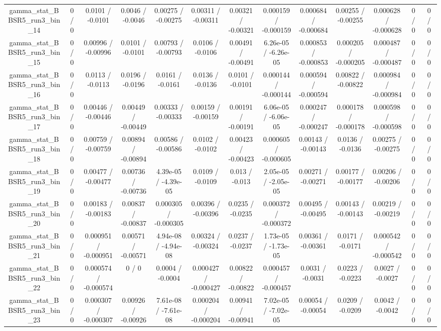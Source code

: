 \documentclass[10pt]{article}
\begin{document}
\begin{table}[htbp]
\begin{center}
\begin{tabular}{|c|c|c|c|c|c|c|c|c|c|c|c|c|}
  gamma_stat_BBSR5_run3_bin_14 & 0 / 0 & 0.0101 / -0.0101 & 0.0046 / -0.0046 & 0.00275 / -0.00275 & 0.00311 / -0.00311 & 0.00321 / -0.00321 & 0.000159 / -0.000159 & 0.000684 / -0.000684 & 0.00255 / -0.00255 & 0.000628 / -0.000628 & 0 / 0 & 0 / 0 \\ 
  gamma_stat_BBSR5_run3_bin_15 & 0 / 0 & 0.00996 / -0.00996 & 0.0101 / -0.0101 & 0.00793 / -0.00793 & 0.0106 / -0.0106 & 0.00491 / -0.00491 & 6.26e-05 / -6.26e-05 & 0.000853 / -0.000853 & 0.000205 / -0.000205 & 0.000487 / -0.000487 & 0 / 0 & 0 / 0 \\ 
  gamma_stat_BBSR5_run3_bin_16 & 0 / 0 & 0.0113 / -0.0113 & 0.0196 / -0.0196 & 0.0161 / -0.0161 & 0.0136 / -0.0136 & 0.0101 / -0.0101 & 0.000144 / -0.000144 & 0.000594 / -0.000594 & 0.00822 / -0.00822 & 0.000984 / -0.000984 & 0 / 0 & 0 / 0 \\ 
  gamma_stat_BBSR5_run3_bin_17 & 0 / 0 & 0.00446 / -0.00446 & 0.00449 / -0.00449 & 0.00333 / -0.00333 & 0.00159 / -0.00159 & 0.00191 / -0.00191 & 6.06e-05 / -6.06e-05 & 0.000247 / -0.000247 & 0.000178 / -0.000178 & 0.000598 / -0.000598 & 0 / 0 & 0 / 0 \\ 
  gamma_stat_BBSR5_run3_bin_18 & 0 / 0 & 0.00759 / -0.00759 & 0.00894 / -0.00894 & 0.00586 / -0.00586 & 0.0102 / -0.0102 & 0.00423 / -0.00423 & 0.000605 / -0.000605 & 0.00143 / -0.00143 & 0.0136 / -0.0136 & 0.00275 / -0.00275 & 0 / 0 & 0 / 0 \\ 
  gamma_stat_BBSR5_run3_bin_19 & 0 / 0 & 0.00477 / -0.00477 & 0.00736 / -0.00736 & 4.39e-05 / -4.39e-05 & 0.0109 / -0.0109 & 0.013 / -0.013 & 2.05e-05 / -2.05e-05 & 0.00271 / -0.00271 & 0.00177 / -0.00177 & 0.00206 / -0.00206 & 0 / 0 & 0 / 0 \\ 
  gamma_stat_BBSR5_run3_bin_20 & 0 / 0 & 0.00183 / -0.00183 & 0.00837 / -0.00837 & 0.000305 / -0.000305 & 0.00396 / -0.00396 & 0.0235 / -0.0235 & 0.000372 / -0.000372 & 0.00495 / -0.00495 & 0.00143 / -0.00143 & 0.00219 / -0.00219 & 0 / 0 & 0 / 0 \\ 
  gamma_stat_BBSR5_run3_bin_21 & 0 / 0 & 0.000951 / -0.000951 & 0.00571 / -0.00571 & 4.94e-08 / -4.94e-08 & 0.00324 / -0.00324 & 0.0237 / -0.0237 & 1.73e-05 / -1.73e-05 & 0.00361 / -0.00361 & 0.0171 / -0.0171 & 0.000542 / -0.000542 & 0 / 0 & 0 / 0 \\ 
  gamma_stat_BBSR5_run3_bin_22 & 0 / 0 & 0.000574 / -0.000574 & 0 / 0 & 0.0004 / -0.0004 & 0.000427 / -0.000427 & 0.00822 / -0.00822 & 0.000457 / -0.000457 & 0.0031 / -0.0031 & 0.0223 / -0.0223 & 0.0027 / -0.0027 & 0 / 0 & 0 / 0 \\ 
  gamma_stat_BBSR5_run3_bin_23 & 0 / 0 & 0.000307 / -0.000307 & 0.00926 / -0.00926 & 7.61e-08 / -7.61e-08 & 0.000204 / -0.000204 & 0.00941 / -0.00941 & 7.02e-05 / -7.02e-05 & 0.00054 / -0.00054 & 0.0209 / -0.0209 & 0.0042 / -0.0042 & 0 / 0 & 0 / 0 \\ 

\end{tabular}
\end{center}
\end{table}
\end{document}
